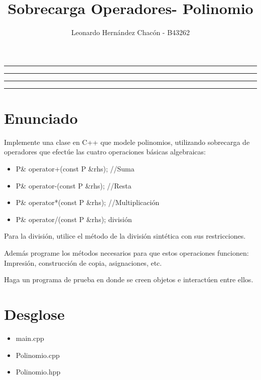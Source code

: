 \documentclass[11pt]{article}
\title{Sobrecarga Operadores- Polinomio}
\author{Leonardo Hern\'andez Chac\'on   - B43262}
\begin{document}
\maketitle
\hrule
\hrule
\tableofcontents
\hspace{5mm}
\hrule
\hrule


\section{Enunciado}

Implemente una clase en C++ que modele polinomios, utilizando sobrecarga de operadores que efect\'ue las cuatro operaciones b\'asicas algebraicas:
   \begin{itemize}
   \item P\& operator+(const P \&rhs); //Suma
   \item P\& operator-(const P \&rhs); //Resta
   \item P\& operator*(const P \&rhs); //Multiplicaci\'on
   \item P\& operator/(const P \&rhs); divisi\'on 
  
   \end{itemize}

Para la divisi\'on, utilice el m\'etodo de la divisi\'on sint\'etica con sus restricciones.

Adem\'as programe los m\'etodos necesarios para que estos operaciones funcionen: Impresi\'on, construcci\'on de copia, asignaciones, etc. 

Haga un programa de prueba en donde se creen objetos e interact\'uen entre ellos.

\section{Desglose}


 \begin{itemize}
   \item main.cpp 
   \item Polinomio.cpp
   \item Polinomio.hpp
   \end{itemize}
\end{document}
